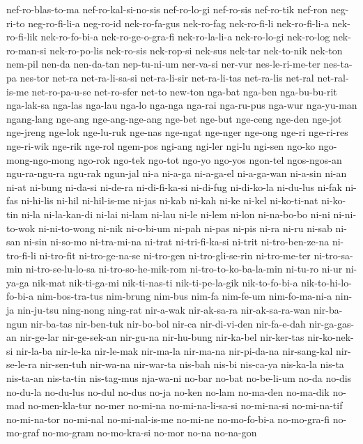 {nef-ro-blas-to-ma nef-ro-kal-si-no-sis nef-ro-lo-gi nef-ro-sis nef-ro-tik
nef-ron neg-ri-to neg-ro-fi-li-a neg-ro-id nek-ro-fa-gus nek-ro-fag
nek-ro-fi-li nek-ro-fi-li-a nek-ro-fi-lik nek-ro-fo-bi-a
nek-ro-ge-o-gra-fi nek-ro-la-li-a nek-ro-lo-gi nek-ro-log nek-ro-man-si
nek-ro-po-lis nek-ro-sis nek-rop-si nek-sus nek-tar nek-to-nik nek-ton
nem-pil nen-da nen-da-tan nep-tu-ni-um ner-va-si ner-vur nes-le-ri-me-ter
nes-ta-pa nes-tor net-ra net-ra-li-sa-si net-ra-li-sir net-ra-li-tas
net-ra-lis net-ral net-ral-is-me net-ro-pa-u-se net-ro-sfer net-to new-ton
nga-bat nga-ben nga-bu-bu-rit nga-lak-sa nga-las nga-lau nga-lo nga-nga
nga-rai nga-ru-pus nga-wur nga-yu-man ngang-lang nge-ang nge-ang-nge-ang
nge-bet nge-but nge-ceng nge-den nge-jot nge-jreng nge-lok nge-lu-ruk
nge-nas nge-ngat nge-nger nge-ong nge-ri nge-ri-res nge-ri-wik nge-rik
nge-rol ngem-pos ngi-ang ngi-ler ngi-lu ngi-sen ngo-ko ngo-mong-ngo-mong
ngo-rok ngo-tek ngo-tot ngo-yo ngo-yos ngon-tel ngos-ngos-an ngu-ra-ngu-ra
ngu-rak ngun-jal ni-a ni-a-ga ni-a-ga-el ni-a-ga-wan ni-a-sin ni-an ni-at
ni-bung ni-da-si ni-de-ra ni-di-fi-ka-si ni-di-fug ni-di-ko-la ni-du-lus
ni-fak ni-fas ni-hi-lis ni-hil ni-hil-is-me ni-jas ni-kab ni-kah ni-ke
ni-kel ni-ko-ti-nat ni-ko-tin ni-la ni-la-kan-di ni-lai ni-lam ni-lau
ni-le ni-lem ni-lon ni-na-bo-bo ni-ni ni-ni-to-wok ni-ni-to-wong ni-nik
ni-o-bi-um ni-pah ni-pas ni-pis ni-ra ni-ru ni-sab ni-san ni-sin ni-so-mo
ni-tra-mi-na ni-trat ni-tri-fi-ka-si ni-trit ni-tro-ben-ze-na ni-tro-fi-li
ni-tro-fit ni-tro-ge-na-se ni-tro-gen ni-tro-gli-se-rin ni-tro-me-ter
ni-tro-sa-min ni-tro-se-lu-lo-sa ni-tro-so-he-mik-rom
ni-tro-to-ko-ba-la-min ni-tu-ro ni-ur ni-ya-ga nik-mat nik-ti-ga-mi
nik-ti-nas-ti nik-ti-pe-la-gik nik-to-fo-bi-a nik-to-hi-lo-fo-bi-a
nim-bos-tra-tus nim-brung nim-bus nim-fa nim-fe-um nim-fo-ma-ni-a nin-ja
nin-ju-tsu ning-nong ning-rat nir-a-wak nir-ak-sa-ra nir-ak-sa-ra-wan
nir-ba-ngun nir-ba-tas nir-ben-tuk nir-bo-bol nir-ca nir-di-vi-den
nir-fa-e-dah nir-ga-gas-an nir-ge-lar nir-ge-sek-an nir-gu-na nir-hu-bung
nir-ka-bel nir-ker-tas nir-ko-nek-si nir-la-ba nir-le-ka nir-le-mak
nir-ma-la nir-ma-na nir-pi-da-na nir-sang-kal nir-se-le-ra nir-sen-tuh
nir-wa-na nir-war-ta nis-bah nis-bi nis-ca-ya nis-ka-la nis-ta nis-ta-an
nis-ta-tin nis-tag-mus nja-wa-ni no-bar no-bat no-be-li-um no-da no-dis
no-du-la no-du-lus no-dul no-dus no-ja no-ken no-lam no-ma-den no-ma-dik
no-mad no-men-kla-tur no-mer no-mi-na no-mi-na-li-sa-si no-mi-na-si
no-mi-na-tif no-mi-na-tor no-mi-nal no-mi-nal-is-me no-mi-ne no-mo-fo-bi-a
no-mo-gra-fi no-mo-graf no-mo-gram no-mo-kra-si no-mor no-na no-na-gon
}
